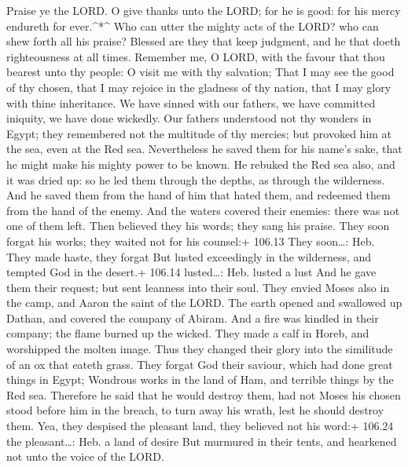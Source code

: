  Praise ye the LORD. O give thanks unto the LORD; for he is
good: for his mercy endureth for ever.\^{}*\^{}  Who can
utter the mighty acts of the LORD? who can shew forth all his praise?
 Blessed are they that keep judgment, and he that doeth
righteousness at all times.  Remember me, O LORD, with the
favour that thou bearest unto thy people: O visit me with thy salvation;
 That I may see the good of thy chosen, that I may rejoice
in the gladness of thy nation, that I may glory with thine inheritance.
 We have sinned with our fathers, we have committed
iniquity, we have done wickedly.  Our fathers understood not
thy wonders in Egypt; they remembered not the multitude of thy mercies;
but provoked him at the sea, even at the Red sea. 
Nevertheless he saved them for his name's sake, that he might make his
mighty power to be known.  He rebuked the Red sea also, and
it was dried up: so he led them through the depths, as through the
wilderness.  And he saved them from the hand of him that
hated them, and redeemed them from the hand of the enemy. 
And the waters covered their enemies: there was not one of them left.
 Then believed they his words; they sang his praise.
 They soon forgat his works; they waited not for his
counsel:+ 106.13 They soon\ldots: Heb. They made haste, they forgat
 But lusted exceedingly in the wilderness, and tempted God
in the desert.+ 106.14 lusted\ldots: Heb. lusted a lust 
And he gave them their request; but sent leanness into their soul.
 They envied Moses also in the camp, and Aaron the saint of
the LORD.  The earth opened and swallowed up Dathan, and
covered the company of Abiram.  And a fire was kindled in
their company; the flame burned up the wicked.  They made a
calf in Horeb, and worshipped the molten image.  Thus they
changed their glory into the similitude of an ox that eateth grass.
 They forgat God their saviour, which had done great things
in Egypt;  Wondrous works in the land of Ham, and terrible
things by the Red sea.  Therefore he said that he would
destroy them, had not Moses his chosen stood before him in the breach,
to turn away his wrath, lest he should destroy them.  Yea,
they despised the pleasant land, they believed not his word:+ 106.24 the
pleasant\ldots: Heb. a land of desire  But murmured in
their tents, and hearkened not unto the voice of the LORD. 
